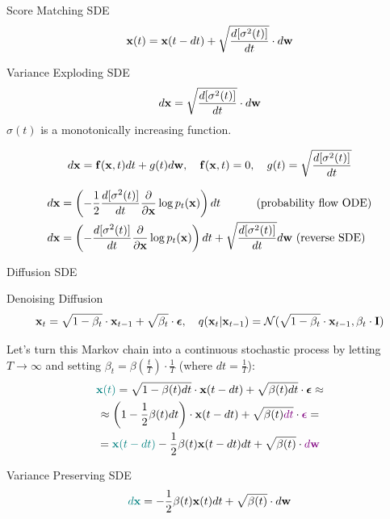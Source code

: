 \documentclass{beamer}
\renewcommand{\eqpause}{}
\renewcommand{\nextonslide}[1]{#1}
\begin{document}
\begin{frame}{Score Matching SDE}
	\vspace{-0.3cm}
	\[
		\mathbf{x}(t) = \mathbf{x}(t - dt) + \sqrt{\frac{ d [\sigma^2(t)]}{dt}} \cdot d \mathbf{w}
	\]
    \eqpause
	\vspace{-0.5cm}
	\begin{block}{Variance Exploding SDE}
		\vspace{-0.3cm}
		\[
			d \mathbf{x} = \sqrt{\frac{ d [\sigma^2(t)]}{dt}} \cdot d \mathbf{w}
		\]
		$\sigma(t)$ is a monotonically increasing function.
	\end{block}
    \eqpause
	\vspace{-0.7cm}
	\[
		d\mathbf{x} = \mathbf{f}(\mathbf{x}, t) dt + g(t) d \mathbf{w}, \quad \mathbf{f}(\mathbf{x}, t) = 0, \quad g(t) = \sqrt{\frac{ d [\sigma^2(t)]}{dt}} 
	\]
    \eqpause
	\vspace{-0.5cm}
	\begin{align*}
		d\mathbf{x} &= \left(-\frac{1}{2} \frac{ d [\sigma^2(t)]}{dt} \frac{\partial}{\partial \mathbf{x}} \log p_t(\mathbf{x}) \right) dt \qquad\quad\, \text{(probability flow ODE)} \\
		d\mathbf{x} &= \left(- \frac{ d [\sigma^2(t)]}{dt} \frac{\partial}{\partial \mathbf{x}}\log p_t(\mathbf{x})\right) dt + \sqrt{\frac{ d [\sigma^2(t)]}{dt}}  d \mathbf{w} \ \text{(reverse SDE)}
	\end{align*}
\end{frame}
\begin{frame}{Diffusion SDE}
	\begin{block}{Denoising Diffusion}
		\vspace{-0.7cm}
		\[
			\mathbf{x}_t = \sqrt{1 - \beta_t} \cdot \mathbf{x}_{t - 1} + \sqrt{\beta_t} \cdot \boldsymbol{\epsilon}, \quad q(\mathbf{x}_t | \mathbf{x}_{t-1}) = \mathcal{N}(\sqrt{1 - \beta_t} \cdot \mathbf{x}_{t-1}, \beta_t \cdot \mathbf{I})
		\]
		\vspace{-0.7cm}
	\end{block}
    \eqpause
	Let's turn this Markov chain into a continuous stochastic process by letting $T \rightarrow \infty$ and setting $\beta_t = \beta(\frac{t}{T}) \cdot \frac{1}{T}$ (where $dt = \frac{1}{T}$):
	\begin{multline*}
		{\color{teal}\bx(t)} = \sqrt{1 - \beta(t) dt} \cdot \bx(t - dt) + \sqrt{\beta(t)dt} \cdot \bepsilon 
		\nextonslide{\approx \\ \approx \left(1 - \frac{1}{2} \beta(t) dt\right) \cdot \bx(t - dt) + \sqrt{\beta(t){\color{violet}dt}} \cdot {\color{violet}\bepsilon}}
		\nextonslide{= \\ = {\color{teal}\bx(t - dt)} - \frac{1}{2} \beta(t) \bx(t - dt) dt  + \sqrt{\beta(t)} \cdot {\color{violet}d \bw}}
	\end{multline*}
    \eqpause
	\vspace{-0.7cm}
	\begin{block}{Variance Preserving SDE}
		\vspace{-0.3cm}
		\[
			{\color{teal}d \mathbf{x}} = - \frac{1}{2} \beta(t) \mathbf{x}(t) dt + \sqrt{\beta(t)} \cdot d \mathbf{w}
		\]
	\end{block}
\end{frame}
\end{document}
